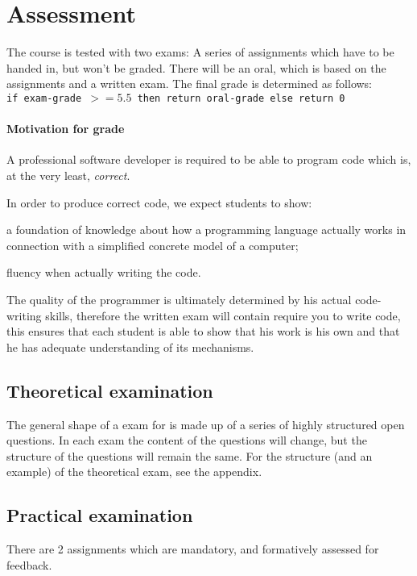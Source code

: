 \section{Assessment}
The course is tested with two exams:
A series of \glspl{assignment} which have to be handed in, but won't be graded. There will be an \gls{oral}, which is based on the \glspl{assignment}
and a written exam. The final grade is determined as follows: \\

\texttt{if \gls{exam}-grade $ >= 5.5 $ then return \gls{oral}-grade else return 0}

\paragraph*{Motivation for grade}
A professional software developer is required to be able to program code which is, at the very least, \textit{correct}.

In order to produce correct code, we expect students to show:
\begin{inparaenum}
\item a foundation of knowledge about how a programming language actually works in connection with a simplified concrete model of a computer;
\item fluency when actually writing the code.
\end{inparaenum}

The quality of the programmer is ultimately determined by his actual code-writing skills, therefore the written exam will contain require you to write code, this ensures that each student is able to show that his work is his own and that he has adequate understanding of its mechanisms.



\subsection{Theoretical examination \modulecode}
The general shape of a \gls{exam} for \texttt{\modulecode} is made up of a series of highly structured open questions.
In each exam the content of the questions will change, but the structure of the questions will remain the same.
For the structure (and an example) of the theoretical exam, see the appendix.


\subsection{Practical examination \modulecode}
There are 2 \glspl{assignment} which are mandatory, and formatively assessed for \gls{feedback}.

